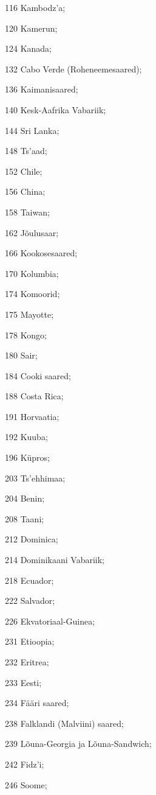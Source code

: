 \documentclass[a4paper]{article}
\begin{document}
\begin{description}
\begin{inparaitem}
    \item[116] Kambodz'a;
    \item[120] Kamerun;
    \item[124] Kanada;
    \item[132] Cabo Verde (Roheneemesaared);
    \item[136] Kaimanisaared;
    \item[140] Kesk-Aafrika Vabariik;
    \item[144] Sri Lanka;
    \item[148] Ts'aad;
    \item[152] Chile;
    \item[156] China;
    \item[158] Taiwan;
    \item[162] Jõulusaar;
    \item[166] Kookosesaared;
    \item[170] Kolumbia;
    \item[174] Komoorid;
    \item[175] Mayotte;
    \item[178] Kongo;
    \item[180] Sair;
    \item[184] Cooki saared;
    \item[188] Costa Rica;
    \item[191] Horvaatia;
    \item[192] Kuuba;
    \item[196] Küpros;
    \item[203] Ts'ehhimaa;
    \item[204] Benin;
    \item[208] Taani;
    \item[212] Dominica;
    \item[214] Dominikaani Vabariik;
    \item[218] Ecuador;
    \item[222] Salvador;
    \item[226] Ekvatoriaal-Guinea;
    \item[231] Etioopia;
    \item[232] Eritrea;
    \item[233] Eesti;
    \item[234] Fääri saared;
    \item[238] Falklandi (Malviini) saared;
    \item[239] Lõuna-Georgia ja Lõuna-Sandwich;
    \item[242] Fidz'i;
    \item[246] Soome;

\end{inparaitem}
\end{description}
\end{document}
